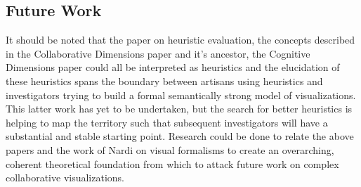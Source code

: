 \documentclass{sig-alternate}
\begin{document}
\subsection{Future Work}
It should be noted that the paper on heuristic evaluation, the concepts
described in the Collaborative Dimensions paper and it's ancestor, the Cognitive
Dimensions paper could all be interpreted as heuristics and the elucidation of
these heuristics spans the boundary between artisans using heuristics and 
investigators trying to build a formal semantically strong model of
visualizations. This latter work has yet to be undertaken, but the search for
better heuristics is helping to map the territory such that subsequent
investigators will have a substantial and stable starting point. Research could
be done to relate the above papers and the work of Nardi on visual formalisms
to create an overarching, coherent theoretical foundation from which to attack
future work on complex collaborative visualizations.



\end{document}

